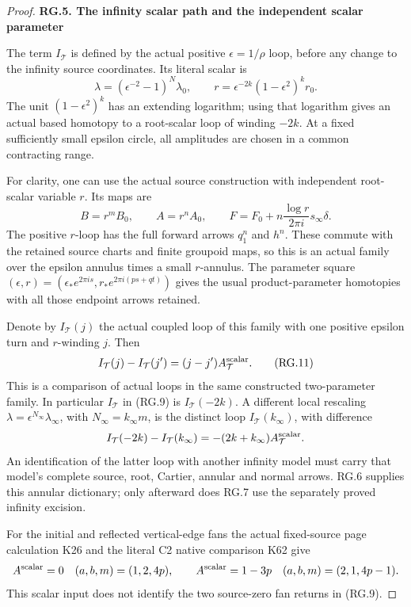 \begin{proof}
\par

\medskip\noindent\textbf{RG.5. The infinity scalar path and the independent scalar parameter}

\par\nobreak

The term \(I_{\mathcal T}\) is defined by the actual positive
\(\epsilon=1/\rho\) loop, before any change to the infinity
source coordinates. Its literal scalar is
\[
 \lambda=(\epsilon^{-2}-1)^N\lambda_0,\qquad
 r=\epsilon^{-2k}(1-\epsilon^2)^k r_0.                \tag{RG.10}
\]
The unit \((1-\epsilon^2)^k\) has an extending logarithm;
using that logarithm gives an actual based homotopy to a
root-scalar loop of winding \(-2k\). At a fixed sufficiently
small epsilon circle, all amplitudes are chosen in a common
contracting range.

For clarity, one can use the actual source construction with
independent root-scalar variable \(r\). Its maps are
\[
 B=r^mB_0,\qquad A=r^nA_0,\qquad
 F=F_0+n\frac{\log r}{2\pi i}s_\infty\delta.
\]
The positive \(r\)-loop has the full forward arrows
\(q_1^n\) and \(h^n\). These commute with the retained source
charts and finite groupoid maps, so this is an actual family
over the epsilon annulus times a small \(r\)-annulus. The
parameter square \((\epsilon,r)=(\epsilon_*e^{2\pi is},
r_*e^{2\pi i(ps+qt)})\) gives the usual product-parameter
homotopies with all those endpoint arrows retained.

Denote by \(I_{\mathcal T}(j)\) the actual coupled loop of this
family with one positive epsilon turn and \(r\)-winding \(j\).
Then
\[
 I_{\mathcal T}(j)-I_{\mathcal T}(j')
       =(j-j')A^{\rm scalar}_{\mathcal T}.             \tag{RG.11}
\]
This is a comparison of actual loops in the same constructed
two-parameter family. In particular \(I_{\mathcal T}\) in
(RG.9) is \(I_{\mathcal T}(-2k)\). A different local rescaling
\(\lambda=\epsilon^{N_\infty}\lambda_\infty\), with
\(N_\infty=k_\infty m\), is the distinct loop
\(I_{\mathcal T}(k_\infty)\), with difference
\[
 I_{\mathcal T}(-2k)-I_{\mathcal T}(k_\infty)
       =-(2k+k_\infty)A^{\rm scalar}_{\mathcal T}.
\]
An identification of the latter loop with another infinity
model must carry that model's complete source, root,
Cartier, annular and normal arrows. RG.6 supplies this
annular dictionary; only afterward does RG.7 use the
separately proved infinity excision.

For the initial and reflected vertical-edge fans the actual
fixed-source page calculation K26 and the literal C2 native
comparison K62 give
\[
 A^{\rm scalar}=0\quad(a,b,m)=(1,2,4p),\qquad
 A^{\rm scalar}=1-3p\quad(a,b,m)=(2,1,4p-1).
\]
This scalar input does not identify the two source-zero fan
returns in (RG.9).


\end{proof}

